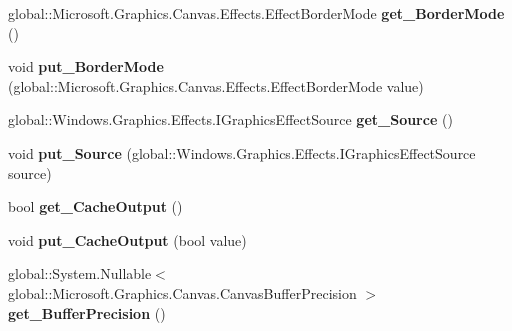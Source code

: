 \begin{DoxyCompactItemize}
\item 
\mbox{\label{class_microsoft_1_1_graphics_1_1_canvas_1_1_effects_1_1_crop_effect_ad455f8e79c452f9b75bdc6cce955b14c}} 
global\+::\+Microsoft.\+Graphics.\+Canvas.\+Effects.\+Effect\+Border\+Mode {\bfseries get\+\_\+\+Border\+Mode} ()
\item 
\mbox{\label{class_microsoft_1_1_graphics_1_1_canvas_1_1_effects_1_1_crop_effect_a44f8835555e034c842513c801cfdf55f}} 
void {\bfseries put\+\_\+\+Border\+Mode} (global\+::\+Microsoft.\+Graphics.\+Canvas.\+Effects.\+Effect\+Border\+Mode value)
\item 
\mbox{\label{class_microsoft_1_1_graphics_1_1_canvas_1_1_effects_1_1_crop_effect_abe38d9ad2be28d73b379306d36c91530}} 
global\+::\+Windows.\+Graphics.\+Effects.\+I\+Graphics\+Effect\+Source {\bfseries get\+\_\+\+Source} ()
\item 
\mbox{\label{class_microsoft_1_1_graphics_1_1_canvas_1_1_effects_1_1_crop_effect_a0349ffb4909aa27c22cbdc2d7771c820}} 
void {\bfseries put\+\_\+\+Source} (global\+::\+Windows.\+Graphics.\+Effects.\+I\+Graphics\+Effect\+Source source)
\item 
\mbox{\label{class_microsoft_1_1_graphics_1_1_canvas_1_1_effects_1_1_crop_effect_add261b4567d53d71aa65cffc172de5ab}} 
bool {\bfseries get\+\_\+\+Cache\+Output} ()
\item 
\mbox{\label{class_microsoft_1_1_graphics_1_1_canvas_1_1_effects_1_1_crop_effect_a37fceed4f7e8fce34a6627620afd1bb3}} 
void {\bfseries put\+\_\+\+Cache\+Output} (bool value)
\item 
\mbox{\label{class_microsoft_1_1_graphics_1_1_canvas_1_1_effects_1_1_crop_effect_a4d11bcf9e081cde464b916ce717bf656}} 
global\+::\+System.\+Nullable$<$ global\+::\+Microsoft.\+Graphics.\+Canvas.\+Canvas\+Buffer\+Precision $>$ {\bfseries get\+\_\+\+Buffer\+Precision} ()

\end{DoxyCompactItemize}
